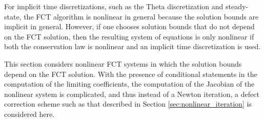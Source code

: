 For implicit time discretizations, such as the Theta discretization
and steady-state, the FCT algorithm is nonlinear in general because the
solution bounds are implicit in general.
However, if one chooses solution bounds that do not depend on the FCT solution,
then the resulting system of equations is only nonlinear if both the conservation law
is nonlinear and an implicit time discretization is used.

This section considers nonlinear FCT systems in which the solution
bounds depend on the FCT solution. With the presence of
conditional statements in the computation of the limiting coefficients,
the computation of the Jacobian of the nonlinear system is complicated,
and thus instead of a Newton iteration, a defect correction scheme
such as that described in Section \ref{sec:nonlinear_iteration} is
considered here.

